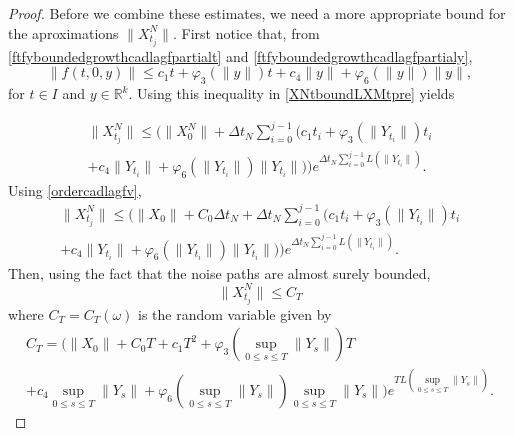 \documentclass[reqno,12pt]{amsart}
\theoremstyle{plain} %
\theoremstyle{definition} %
\begin{document}
\begin{proof}
    Before we combine these estimates, we need a more appropriate bound for the aproximations $\|X_{t_j}^N\|.$ First notice that, from \eqref{ftfyboundedgrowthcadlagfpartialt} and \eqref{ftfyboundedgrowthcadlagfpartialy},
    \[
        \|f(t, 0, y)\| \leq c_1t + \varphi_3(\|y\|)t + c_4\|y\| + \varphi_6(\|y\|)\|y\|,
    \]
    for $t\in I$ and $y\in\mathbb{R}^k.$ Using this inequality in \eqref{XNtboundLXMtpre} yields 

    \begin{multline*}
        \|X_{t_j}^N\| \leq \Bigg(\|X_0^N\| + \Delta t_N \sum_{i=0}^{j-1} \bigg( c_1t_i + \varphi_3(\|Y_{t_i}\|)t_i  \\
        + c_4\|Y_{t_i}\| + \varphi_6(\|Y_{t_i}\|)\|Y_{t_i}\|\bigg)\Bigg)e^{\Delta t_N \sum_{i=0}^{j-1} L(\|Y_{t_i}\|)}.
    \end{multline*}
    Using \eqref{ordercadlagfv},
    \begin{multline*}
        \|X_{t_j}^N\| \leq \Bigg(\|X_0\| + C_0 \Delta t_N + \Delta t_N \sum_{i=0}^{j-1} \bigg( c_1t_i + \varphi_3(\|Y_{t_i}\|)t_i  \\
        + c_4\|Y_{t_i}\| + \varphi_6(\|Y_{t_i}\|)\|Y_{t_i}\|\bigg)\Bigg)e^{\Delta t_N \sum_{i=0}^{j-1} L(\|Y_{t_i}\|)}.
    \end{multline*}
    Then, using the fact that the noise paths are almost surely bounded,
    \begin{equation}
        \label{boundCM}
        \|X_{t_j}^N\| \leq C_T
    \end{equation}
    where $C_T = C_T(\omega)$ is the random variable given by
    \begin{multline}
        \label{defCM}
        C_T = \bigg(\|X_0\| + C_0T + c_1T^2 + \varphi_3\left(\sup_{0\leq s \leq T}\|Y_s\|\right)T \\
        + c_4\sup_{0\leq s \leq T}\|Y_s\| + \varphi_6\left(\sup_{0\leq s \leq T}\|Y_s\|\right)\sup_{0\leq s \leq T}\|Y_s\|\bigg)e^{T L\left(\sup_{0\leq s \leq T}\|Y_s\|\right)}.
    \end{multline}


\end{proof}
\end{document}
